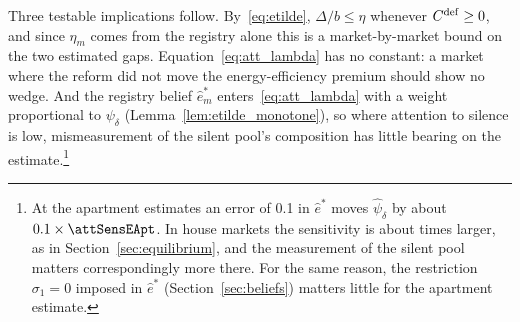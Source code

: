 Three testable implications follow. By~\eqref{eq:etilde}, $\Delta/b\le\eta$ whenever $C^{\rm def}\ge0$, and since $\eta_m$ comes from the registry alone this is a market-by-market bound on the two estimated gaps. Equation~\eqref{eq:att_lambda} has no constant: a market where the reform did not move the energy-efficiency premium should show no wedge. And the registry belief $\hat e^*_m$ enters~\eqref{eq:att_lambda} with a weight proportional to $\psi_\delta$ (Lemma~\ref{lem:etilde_monotone}), so where attention to silence is low, mismeasurement of the silent pool's composition has little bearing on the estimate.\footnote{At the apartment estimates an error of 0.1 in $\hat e^*$ moves $\hat\psi_\delta$ by about $0.1\times\attSensEApt$. In house markets the sensitivity is about \attSensRatio{} times larger, as in Section~\ref{sec:equilibrium}, and the measurement of the silent pool matters correspondingly more there. For the same reason, the restriction $\sigma_1=0$ imposed in $\hat e^*$ (Section~\ref{sec:beliefs}) matters little for the apartment estimate.}
